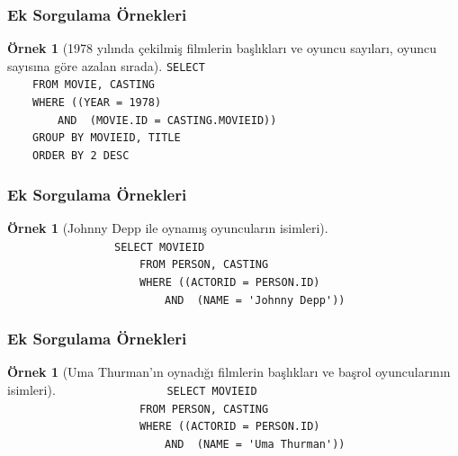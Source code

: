 \documentclass[dvipsnames]{beamer}
\theoremstyle{definition}
\theoremstyle{example}
\newtheorem{ornek}[theorem]{Örnek}
\theoremstyle{plain}
\begin{document}
\begin{frame}[fragile]
  \frametitle{Ek Sorgulama Örnekleri}

  \begin{ornek}[1978 yılında çekilmiş filmlerin başlıkları ve oyuncu sayıları,
                oyuncu sayısına göre azalan sırada]
\lstinline!SELECT! \\
~~~~\lstinline!FROM MOVIE, CASTING!\\
\pause
~~~~\lstinline!WHERE ((YEAR = 1978)!\\
~~~~~~~~\lstinline!AND  (MOVIE.ID = CASTING.MOVIEID))!\\
\pause
~~~~\lstinline!GROUP BY MOVIEID, TITLE!\\
\pause\pause
~~~~\lstinline!ORDER BY 2 DESC!
  \end{ornek}
\end{frame}

\begin{frame}[fragile]
  \frametitle{Ek Sorgulama Örnekleri}

  \begin{ornek}[Johnny Depp ile oynamış oyuncuların isimleri]
~~~~~~~~~~~~~~~~~\lstinline!SELECT MOVIEID!\\
~~~~~~~~~~~~~~~~~~~~~\lstinline!FROM PERSON, CASTING!\\
~~~~~~~~~~~~~~~~~~~~~\lstinline!WHERE ((ACTORID = PERSON.ID)!\\
~~~~~~~~~~~~~~~~~~~~~~~~~\lstinline!AND  (NAME = 'Johnny Depp'))!\\
  \end{ornek}
\end{frame}

\begin{frame}[fragile]
  \frametitle{Ek Sorgulama Örnekleri}

  \begin{ornek}[Uma Thurman'ın oynadığı filmlerin başlıkları ve başrol
                oyuncularının isimleri]
~~~~~~~~~~~~~~~~~\lstinline!SELECT MOVIEID!\\
~~~~~~~~~~~~~~~~~~~~~\lstinline!FROM PERSON, CASTING!\\
~~~~~~~~~~~~~~~~~~~~~\lstinline!WHERE ((ACTORID = PERSON.ID)!\\
~~~~~~~~~~~~~~~~~~~~~~~~~\lstinline!AND  (NAME = 'Uma Thurman'))!\\
  \end{ornek}
\end{frame}
\end{document}
